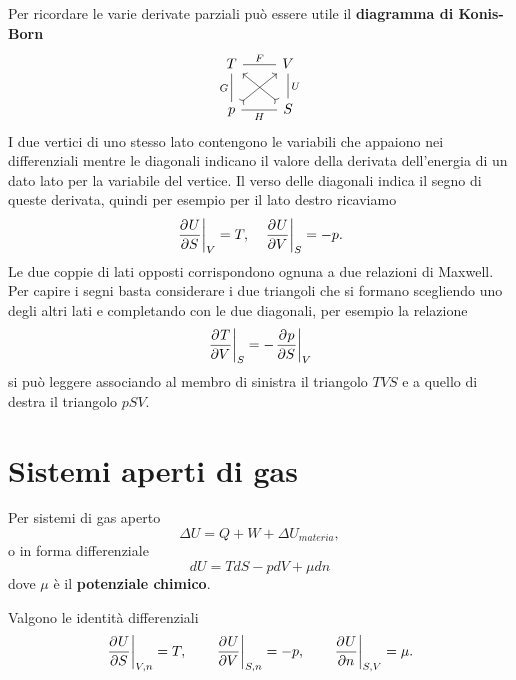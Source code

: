 \bigskip
\noindent
Per ricordare le varie derivate parziali pu\`o essere utile il \textbf{diagramma di Konis-Born}
\[\begin{tikzcd}
	T & V \\
	p & S
	\arrow["H"', no head, from=2-1, to=2-2]
	\arrow["F", no head, from=1-1, to=1-2]
	\arrow["U", no head, from=1-2, to=2-2]
	\arrow["G"', no head, from=1-1, to=2-1]
	\arrow[tail, from=2-1, to=1-2]
	\arrow[tail, from=2-2, to=1-1]
\end{tikzcd}\]
I due vertici di uno stesso lato contengono le variabili che appaiono nei differenziali mentre le diagonali indicano il valore della derivata dell'energia di un dato lato per la variabile del vertice. Il verso delle diagonali indica il segno di queste derivata, quindi per esempio per il lato destro ricaviamo
\[\ppb SUV=T,\quad \ppb VUS=-p.\]
Le due coppie di lati opposti corrispondono ognuna a due relazioni di Maxwell. Per capire i segni basta considerare i due triangoli che si formano scegliendo uno degli altri lati e completando con le due diagonali, per esempio la relazione
\[\ppb VTS=-\ppb SpV\]
si pu\`o leggere associando al membro di sinistra il triangolo $TVS$ e a quello di destra il triangolo $pSV$.

\section{Sistemi aperti di gas}
Per sistemi di gas aperto
\[\Delta U=Q+W+\Delta U_{materia},\]
o in forma differenziale
\[dU=TdS-pdV+\mu dn\]
dove $\mu$ \`e il \textbf{potenziale chimico}.
\begin{remark}
Valgono le identit\`a differenziali
\[\ppb SU{V,n}=T,\qquad \ppb VU{S,n}=-p,\qquad \ppb nU{S,V}=\mu.\]
\end{remark}












